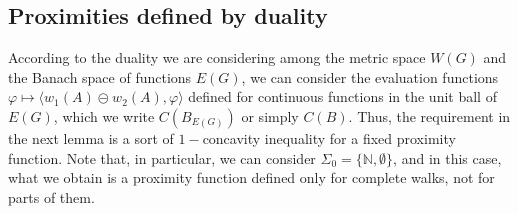 \documentclass[preprint,12pt]{elsarticle}
\begin{document}
\subsection{Proximities defined by duality} \label{s4.2}
According to the duality we are considering among the metric space $W(G)$ and the Banach space of functions $E(G)$, we can consider the evaluation functions $\varphi \mapsto \langle w_1(A) \circleddash w_2(A), \varphi \rangle$ defined for continuous functions in the unit ball of $E(G)$, which we write $C(B_{E(G)})$ or simply $C(B).$ Thus, the requirement in the next lemma is a sort of $1-$concavity inequality for a fixed proximity function. Note that, in particular, we can consider $ \Sigma_0 = \{ \mathbb{N}, \emptyset \} $, and in this case, what we obtain is a proximity function defined only for complete walks, not for parts of them.
\end{document}

